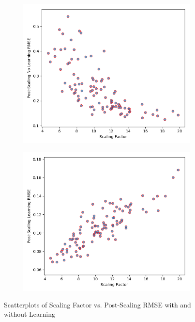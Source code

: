 \documentclass[oneside,12pt,openany]{book}
\begin{document}
    \begin{figure}[hbt!]
        \centering
        \begin{subfigure}[b]{.48\textwidth}
           \includegraphics[width=\linewidth]{images/ScalingFactorbyPost-ScalingNoLearningRMSE-Unchanged.png}
        \end{subfigure}
        \begin{subfigure}[b]{.48\textwidth}
             \includegraphics[width=\linewidth]{images/ScalingFactorbyPost-ScalingLearningRMSE-Unchanged.png}
        \end{subfigure}
        \caption{Scatterplots of Scaling Factor vs. Post-Scaling RMSE with and without Learning}
        \label{fig:genscatter:unchanged}
    \end{figure}
\end{document}
